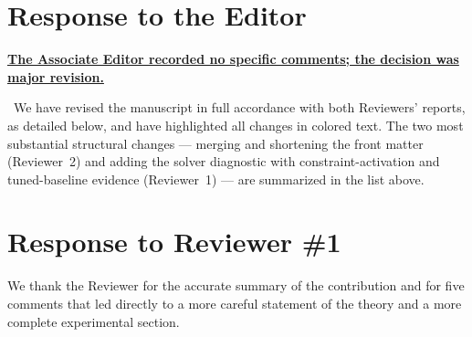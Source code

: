 \documentclass[11pt]{article}
\newcommand{\response}[1]{\smallskip\noindent{\color{blue!60!black}\textbf{Response.}}\ #1\par\medskip}
\newenvironment{point}[1]{\medskip\noindent\textbf{\uline{#1}}\par}{\par}
\begin{document}
\section*{Response to the Editor}

\begin{point}{The Associate Editor recorded no specific comments; the decision was major
revision.}
\response{We have revised the manuscript in full accordance with both Reviewers' reports,
as detailed below, and have highlighted all changes in colored text. The two most
substantial structural changes --- merging and shortening the front matter (Reviewer~2)
and adding the solver diagnostic with constraint-activation and tuned-baseline evidence
(Reviewer~1) --- are summarized in the list above.}
\end{point}

\section*{Response to Reviewer \#1}

\noindent We thank the Reviewer for the accurate summary of the contribution and for five
comments that led directly to a more careful statement of the theory and a more complete
experimental section.
\end{document}
